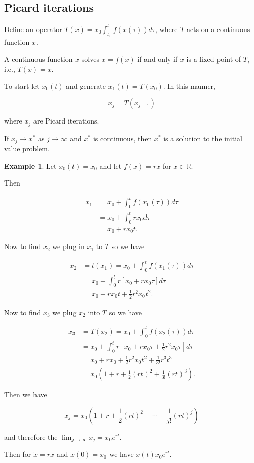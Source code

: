 \documentclass[12pt]{article}
\theoremstyle{definition}
\newtheorem*{example}{Example}
\begin{document}
\subsection{Picard iterations}

Define an operator $T(x) = x_0 \int^{t}_{t_0} f(x(\tau)) d\tau$, where
$T$ acts on a continuous function $x$.

A continuous function $x$ solves $\dot{x} = f(x)$ if and only if $x$ is a fixed
point of $T$, i.e., $T(x) = x$.

To start let $x_0(t)$ and generate $x_1 (t) = T(x_0)$. In this manner,

\[
x_j = T(x_{j - 1})
\]

where $x_j$ are Picard iterations.

If $x_j \rightarrow x^*$ as $j \rightarrow \infty$ and $x^*$ is continuous, then
$x^*$ is a solution to the initial value problem.

\begin{example}
Let $x_0(t) = x_0$ and let $f(x) = rx$ for $x \in \mathbb{R}$.

Then

\begin{align*}
x_1 &= x_0 + \int^{t}_{0} f(x_0(\tau))d\tau \\
&= x_0 + \int^{t}_0 rx_0 d\tau \\
&= x_0 + rx_0 t.
\end{align*}

Now to find $x_2$ we plug in $x_1$ to $T$ so we have

\begin{align*}
x_2 &= t(x_1) = x_0 + \int^{t}_0 f(x_1(\tau))d\tau \\
&= x_0 + \int^{t}_0 r[x_0 + rx_0 \tau]d\tau \\
&= x_0 + rx_0 t + \frac{1}{2} r^2 x_0 t^2.
\end{align*}

Now to find $x_3$ we plug $x_2$ into $T$ so we have

\begin{align*}
x_3 &= T(x_2) = x_0 + \int^{t}_0 f(x_2(\tau))d\tau \\
&= x_0 + \int^{t}_0 r[x_0 + rx_0 \tau + \frac{1}{2} r^2 x_0 \tau]d\tau \\
&= x_0 + rx_0 + \frac{1}{2} r^2x_0 t^2 + \frac{1}{3!} r^3 t^3 \\
&= x_0(1 + r + \frac{1}{2}(rt)^2 + \frac{1}{3!}(rt)^3).
\end{align*}

Then we have

\[
x_j = x_0(1 + r + \frac{1}{2} (rt)^2 + \cdots + \frac{1}{j!}(rt)^j)
\]

and therefore the $\lim_{j \rightarrow \infty} x_j = x_0 e^{rt}$.

Then for $\dot{x} = rx$ and $x(0) = x_0$ we have $x(t)x_0 e^{rt}$.
\end{example}
\end{document}
